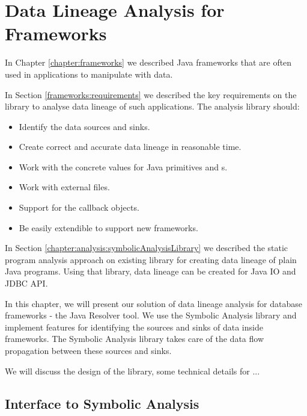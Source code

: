 
\chapter{Data Lineage Analysis for Frameworks \label{chapter:implementation}}

In Chapter \ref{chapter:frameworks} we described Java frameworks
that are often used in applications to manipulate with data.

In Section \ref{frameworks:requirements} we described the key requirements
on the library to analyse data lineage of such applications.
The analysis library should:
\begin{itemize}
  \item Identify the data sources and sinks.
  \item Create correct and accurate data lineage in reasonable time.
  \item Work with the concrete values for Java primitives and s.
  \item Work with external files.
  \item Support for the callback objects.
  \item Be easily extendible to support new frameworks.
\end{itemize}

In Section \ref{chapter:analysis:symbolicAnalysisLibrary} we described the
static program analysis approach on existing library for creating data lineage of plain Java programs.
Using that library, data lineage can be created for Java IO and JDBC API.

In this chapter, we will present our solution of data lineage analysis
for database frameworks - the Java Resolver tool.
We use the Symbolic Analysis library and implement
features for identifying the sources and sinks of data inside frameworks.
The Symbolic Analysis library takes care of the data flow propagation between
these sources and sinks.

We will discuss the design of the library, some technical details
for ...




\section{Interface to Symbolic Analysis \label{chapter:implementation:interface}}






